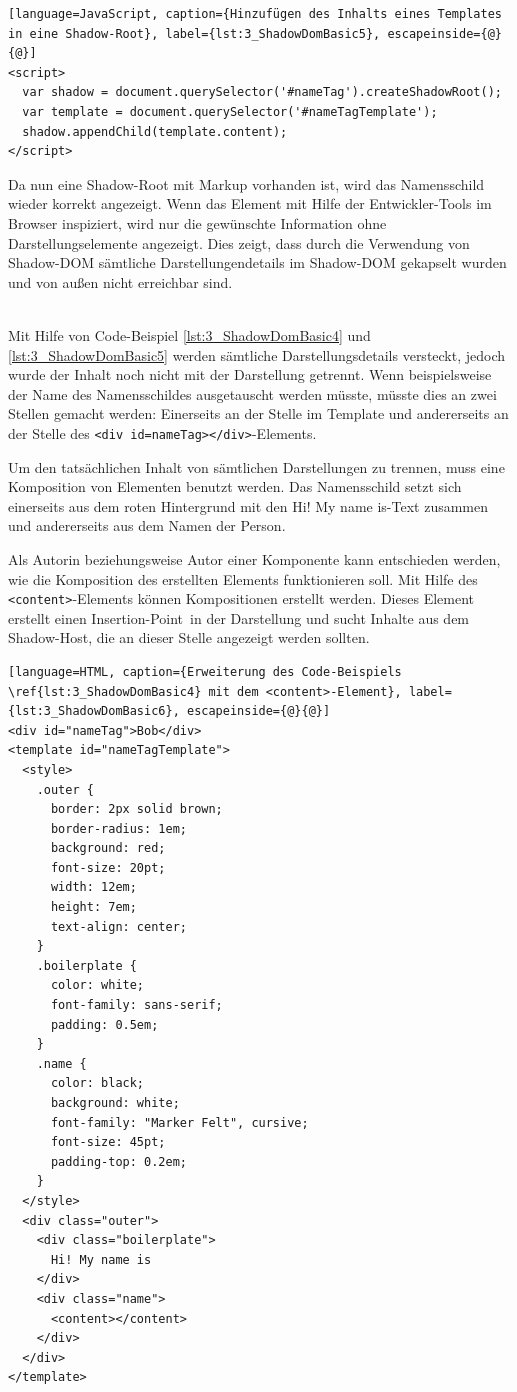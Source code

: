 \begin{enumerate}
\begin{lstlisting}[language=JavaScript, caption={Hinzufügen des Inhalts eines Templates in eine Shadow-Root}, label={lst:3_ShadowDomBasic5}, escapeinside={@}{@}]
<script>
  var shadow = document.querySelector('#nameTag').createShadowRoot();
  var template = document.querySelector('#nameTagTemplate');
  shadow.appendChild(template.content);
</script>
\end{lstlisting}

Da nun eine Shadow-Root mit Markup vorhanden ist, wird das Namensschild wieder korrekt angezeigt. Wenn das Element mit Hilfe der Entwickler-Tools im Browser inspiziert, wird nur die gewünschte Information ohne Darstellungselemente angezeigt. Dies zeigt, dass durch die Verwendung von Shadow-DOM sämtliche Darstellungendetails im Shadow-DOM gekapselt wurden und von außen nicht erreichbar sind.

 \hfill \\
Mit Hilfe von Code-Beispiel \ref{lst:3_ShadowDomBasic4} und \ref{lst:3_ShadowDomBasic5} werden sämtliche Darstellungsdetails versteckt, jedoch wurde der Inhalt noch nicht mit der Darstellung getrennt. Wenn beispielsweise der Name des Namensschildes ausgetauscht werden müsste, müsste dies an zwei Stellen gemacht werden: Einerseits an der Stelle im Template und andererseits an der Stelle des \lstinline|<div id=nameTag></div>|-Elements.

Um den tatsächlichen Inhalt von sämtlichen Darstellungen zu trennen, muss eine Komposition von Elementen benutzt werden. Das Namensschild setzt sich einerseits aus dem roten Hintergrund mit den \glqq Hi! My name is\grqq -Text zusammen und andererseits aus dem Namen der Person.

Als Autorin beziehungsweise Autor einer Komponente kann entschieden werden, wie die Komposition des erstellten Elements funktionieren soll. Mit Hilfe des \lstinline|<content>|-Elements können Kompositionen erstellt werden. Dieses Element erstellt einen \glqq Insertion-Point\grqq\ in der Darstellung und sucht Inhalte aus dem Shadow-Host, die an dieser Stelle angezeigt werden sollten.

\begin{lstlisting}[language=HTML, caption={Erweiterung des Code-Beispiels \ref{lst:3_ShadowDomBasic4} mit dem <content>-Element}, label={lst:3_ShadowDomBasic6}, escapeinside={@}{@}]
<div id="nameTag">Bob</div>
<template id="nameTagTemplate">
  <style>
    .outer {
      border: 2px solid brown;
      border-radius: 1em;
      background: red;
      font-size: 20pt;
      width: 12em;
      height: 7em;
      text-align: center;
    }
    .boilerplate {
      color: white;
      font-family: sans-serif;
      padding: 0.5em;
    }
    .name {
      color: black;
      background: white;
      font-family: "Marker Felt", cursive;
      font-size: 45pt;
      padding-top: 0.2em;
    }
  </style>
  <div class="outer">
    <div class="boilerplate">
      Hi! My name is
    </div>
    <div class="name">
      <content></content>
    </div>
  </div>
</template>
\end{lstlisting}


\end{enumerate}
